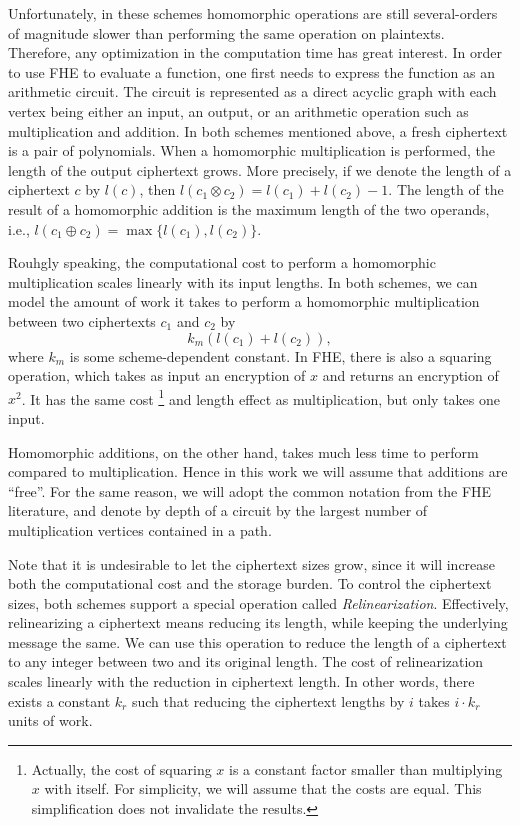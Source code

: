 \documentclass[11pt]{article} %
\theoremstyle{plain}
\theoremstyle{definition}
\begin{document}
Unfortunately, in these schemes homomorphic operations are still several-orders of magnitude slower than performing the same operation on plaintexts. Therefore, any optimization in the computation time has great interest. In order to use FHE to evaluate a function, one first needs to express the function as an arithmetic circuit. The circuit is represented as a direct acyclic graph with each vertex being either an input, an output, or an arithmetic operation such as multiplication and addition. In both schemes mentioned above, a fresh ciphertext is a pair of polynomials. When a homomorphic multiplication is performed, the length of the output ciphertext grows. More precisely, if we denote the 
length of a ciphertext $c$ by $l(c)$, then $l(  c_1 \otimes c_2 ) = l(c_1) +  l(c_2) - 1$. The length of the result of a homomorphic addition is the maximum length of the two operands, i.e., $l(  c_1 \oplus c_2 ) = \max\{l(c_1), l(c_2)\}$. 

Rouhgly speaking, the computational cost to perform a homomorphic multiplication scales linearly with its input lengths. In both schemes, 
we can model the amount of work it takes to perform a homomorphic multiplication between two ciphertexts $c_1$ and $c_2$ by 
\[
	k_m (l(c_1) + l(c_2)), 
\] 
where $k_m$ is some scheme-dependent constant. In FHE, there is also a squaring operation, which takes as input an encryption of $x$ and returns an encryption of $x^2$. It has the same cost \footnote{Actually, the cost of squaring $x$ is a constant factor smaller than multiplying $x$ with itself. For simplicity, we will assume that the costs are equal. This simplification does not invalidate the results.} and length effect as multiplication, but only takes one input. 

Homomorphic additions, on the other hand, takes much less time to perform compared to multiplication. Hence in this work we will assume that additions are ``free''.  For the same reason, we will adopt the common notation from the FHE literature, and denote by depth of a circuit by the largest number of multiplication vertices contained in a path. 

Note that it is undesirable to let the ciphertext sizes grow, since it will increase both the computational cost and the storage burden. To control the ciphertext sizes, both schemes support a special operation called \emph{Relinearization}. Effectively, relinearizing a ciphertext means reducing its length, while keeping the underlying message the same. We can use this operation to reduce the length of a ciphertext to any integer between two and its original length.  The cost of relinearization scales linearly with the reduction in ciphertext length. In other words, there exists a constant $k_r$ such that reducing the ciphertext lengths by $i$ takes $i \cdot k_r $ units of work. 
\end{document}
